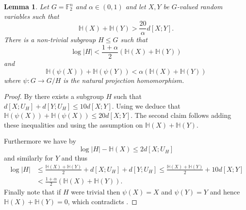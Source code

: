 \documentclass[10pt,a4paper]{article}
\newtheorem{lemma}[theorem]{Lemma}
\newcommand{\lean}[1]{}
\newcommand{\uses}[1]{}
\newcommand{\leanok}{}
\begin{document}
\begin{lemma}\label{app-ent-pfr}\lean{app_ent_PFR}\leanok
Let $G=\mathbb{F}_2^n$ and $\alpha\in (0,1)$ and let $X,Y$ be $G$-valued
random variables such that
\[\mathbb{H}(X)+\mathbb{H}(Y)> \frac{20}{\alpha} d[X;Y].\]
There is a non-trivial subgroup $H\leq G$ such that
\[\log \lvert H\rvert <\frac{1+\alpha}{2}(\mathbb{H}(X)+\mathbb{H}(Y))\] and
\[\mathbb{H}(\psi(X))+\mathbb{H}(\psi(Y))< \alpha (\mathbb{H}(X)+\mathbb{H}(Y))\]
where $\psi:G\to G/H$ is the natural projection homomorphism.
\end{lemma}
\begin{proof}
\uses{entropy-pfr-improv, ruzsa-diff, dist-projection, ruzsa-nonneg}\leanok
By  there exists a subgroup $H$ such that
$d[X;U_H] + d[Y;U_H] \leq 10 d[X;Y]$. Using  we
deduce that $\mathbb{H}(\psi(X)) + \mathbb{H}(\psi(X)) \leq 20 d[X;Y]$. The
second claim follows adding these inequalities and using the assumption on
$\mathbb{H}(X)+\mathbb{H}(Y)$.

Furthermore we have by 
\[\log \lvert H \rvert-\mathbb{H}(X)\leq 2d[X;U_H]\]
and similarly for $Y$ and thus
\begin{align*}
\log \lvert  H\rvert
&\leq
\frac{\mathbb{H}(X)+\mathbb{H}(Y)}{2}+d[X;U_H] + d[Y;U_H] \leq
\frac{\mathbb{H}(X)+\mathbb{H}(Y)}{2}+ 10d[X;Y]
\\& <
\frac{1+\alpha}{2}(\mathbb{H}(X)+\mathbb{H}(Y)).
\end{align*}
Finally note that if $H$
were trivial then $\psi(X)=X$ and $\psi(Y)=Y$ and hence
$\mathbb{H}(X)+\mathbb{H}(Y)=0$, which contradicts .
\end{proof}
\end{document}
